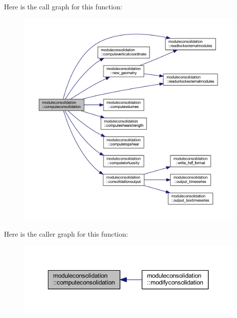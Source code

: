 Here is the call graph for this function\+:\nopagebreak
\begin{figure}[H]
\begin{center}
\leavevmode
\includegraphics[width=350pt]{namespacemoduleconsolidation_ad7db155588df8bc22ff9b3934aff50f7_cgraph}
\end{center}
\end{figure}
Here is the caller graph for this function\+:\nopagebreak
\begin{figure}[H]
\begin{center}
\leavevmode
\includegraphics[width=341pt]{namespacemoduleconsolidation_ad7db155588df8bc22ff9b3934aff50f7_icgraph}
\end{center}
\end{figure}
\mbox{\label{namespacemoduleconsolidation_a71e8c451239a619147b24a85ae396e8e}} 
